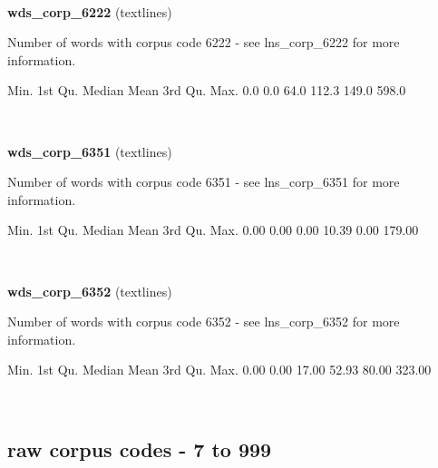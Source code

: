 \documentclass[]{article}
\newenvironment{Shaded}{\begin{snugshade}}{\end{snugshade}}
\newcommand{\FloatTok}[1]{\textcolor[rgb]{0.00,0.00,0.81}{{#1}}}
\newcommand{\NormalTok}[1]{{#1}}
\begin{document}
~

\vspace{1em}

\textbf{wds\_corp\_6222} (textlines)

Number of words with corpus code 6222 - see lns\_corp\_6222 for more
information.

\begin{Shaded}
\begin{Highlighting}[]
   \NormalTok{Min. 1st Qu.  Median    Mean 3rd Qu.    Max. }
    \FloatTok{0.0}     \FloatTok{0.0}    \FloatTok{64.0}   \FloatTok{112.3}   \FloatTok{149.0}   \FloatTok{598.0} 
\end{Highlighting}
\end{Shaded}

~

\vspace{1em}

\textbf{wds\_corp\_6351} (textlines)

Number of words with corpus code 6351 - see lns\_corp\_6351 for more
information.

\begin{Shaded}
\begin{Highlighting}[]
   \NormalTok{Min. 1st Qu.  Median    Mean 3rd Qu.    Max. }
   \FloatTok{0.00}    \FloatTok{0.00}    \FloatTok{0.00}   \FloatTok{10.39}    \FloatTok{0.00}  \FloatTok{179.00} 
\end{Highlighting}
\end{Shaded}

~

\vspace{1em}

\textbf{wds\_corp\_6352} (textlines)

Number of words with corpus code 6352 - see lns\_corp\_6352 for more
information.

\begin{Shaded}
\begin{Highlighting}[]
   \NormalTok{Min. 1st Qu.  Median    Mean 3rd Qu.    Max. }
   \FloatTok{0.00}    \FloatTok{0.00}   \FloatTok{17.00}   \FloatTok{52.93}   \FloatTok{80.00}  \FloatTok{323.00} 
\end{Highlighting}
\end{Shaded}

~

\vspace{1em}

\subsection{raw corpus codes - 7 to
999}\label{raw-corpus-codes---7-to-999}
\end{document}
